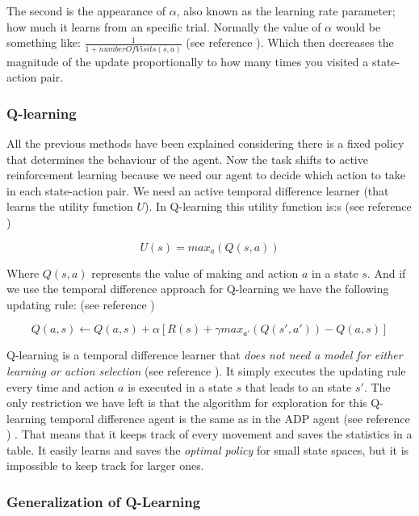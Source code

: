 The second is the appearance of $\alpha$, also known as the learning rate parameter; how much it learns from an specific trial. Normally the value of  $\alpha$ would be something like: $\frac{1}{1+numberOfVisits(s,a)}$  (see reference \cite[p382]{ml_tom_mitchel}). Which then decreases the magnitude of the update proportionally to how many times you visited a state-action pair.\\
 

\subsubsection{Q-learning}

All the previous methods have been explained considering there is a fixed policy that determines the behaviour of the agent. Now the task shifts to active reinforcement learning because we need our agent to decide which action to take in each state-action pair. We need an active temporal difference learner (that learns the utility function $U$). In Q-learning this utility function is:s (see reference \cite{rl})

\begin{equation}
U(s) = max_a(Q(s,a))
\end{equation}

Where $Q(s,a)$ represents the value of making and action $a$ in a state $s$. And if we use the temporal difference approach for Q-learning we have the following updating rule:  (see reference \cite{rl}) 

\begin{equation}
Q(a,s) \leftarrow  Q(a,s)  + \alpha [R(s) + \gamma max_{a'}(Q(s',a')) - Q(a,s)]
\end{equation}

Q-learning is a temporal difference learner that \textit{does not need a model for either learning or action selection} (see reference \cite[p775]{rl}). It simply executes the updating rule every time and action $a$ is executed in a state $s$ that leads to an state $s'$. The only restriction we have left is that the algorithm for exploration for this Q-learning temporal difference agent is the same as in the ADP agent  (see reference \cite[p776]{rl}) . That means that it keeps track of every movement and saves the statistics in a table. It easily learns and saves the \emph{optimal policy} for small state spaces, but it is impossible to keep track for larger ones. 

\subsubsection{Generalization of Q-Learning}	\label{generalization}


